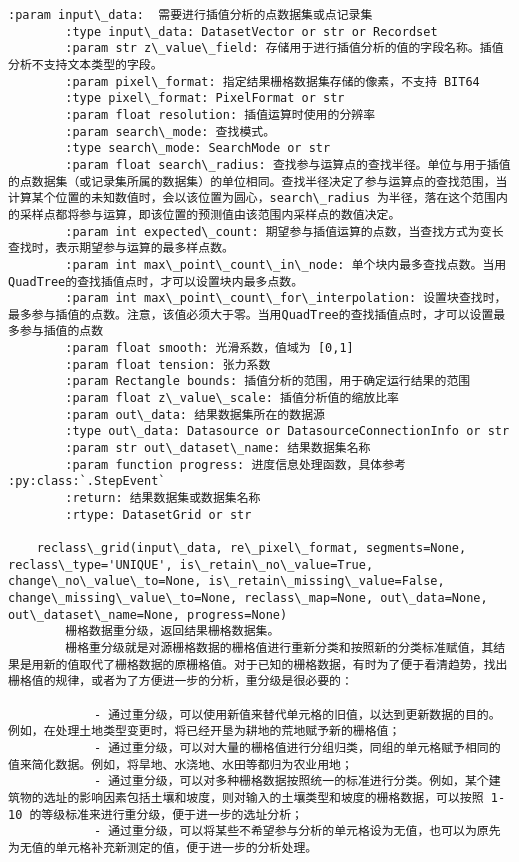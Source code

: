 \documentclass[11pt]{article}
\begin{document}
\begin{Verbatim}[commandchars=\\\{\}]
        :param input\_data:  需要进行插值分析的点数据集或点记录集
        :type input\_data: DatasetVector or str or Recordset
        :param str z\_value\_field: 存储用于进行插值分析的值的字段名称。插值分析不支持文本类型的字段。
        :param pixel\_format: 指定结果栅格数据集存储的像素，不支持 BIT64
        :type pixel\_format: PixelFormat or str
        :param float resolution: 插值运算时使用的分辨率
        :param search\_mode: 查找模式。
        :type search\_mode: SearchMode or str
        :param float search\_radius: 查找参与运算点的查找半径。单位与用于插值的点数据集（或记录集所属的数据集）的单位相同。查找半径决定了参与运算点的查找范围，当计算某个位置的未知数值时，会以该位置为圆心，search\_radius 为半径，落在这个范围内的采样点都将参与运算，即该位置的预测值由该范围内采样点的数值决定。
        :param int expected\_count: 期望参与插值运算的点数，当查找方式为变长查找时，表示期望参与运算的最多样点数。
        :param int max\_point\_count\_in\_node: 单个块内最多查找点数。当用QuadTree的查找插值点时，才可以设置块内最多点数。
        :param int max\_point\_count\_for\_interpolation: 设置块查找时，最多参与插值的点数。注意，该值必须大于零。当用QuadTree的查找插值点时，才可以设置最多参与插值的点数
        :param float smooth: 光滑系数，值域为 [0,1]
        :param float tension: 张力系数
        :param Rectangle bounds: 插值分析的范围，用于确定运行结果的范围
        :param float z\_value\_scale: 插值分析值的缩放比率
        :param out\_data: 结果数据集所在的数据源
        :type out\_data: Datasource or DatasourceConnectionInfo or str
        :param str out\_dataset\_name: 结果数据集名称
        :param function progress: 进度信息处理函数，具体参考 :py:class:`.StepEvent`
        :return: 结果数据集或数据集名称
        :rtype: DatasetGrid or str
    
    reclass\_grid(input\_data, re\_pixel\_format, segments=None, reclass\_type='UNIQUE', is\_retain\_no\_value=True, change\_no\_value\_to=None, is\_retain\_missing\_value=False, change\_missing\_value\_to=None, reclass\_map=None, out\_data=None, out\_dataset\_name=None, progress=None)
        栅格数据重分级，返回结果栅格数据集。
        栅格重分级就是对源栅格数据的栅格值进行重新分类和按照新的分类标准赋值，其结果是用新的值取代了栅格数据的原栅格值。对于已知的栅格数据，有时为了便于看清趋势，找出栅格值的规律，或者为了方便进一步的分析，重分级是很必要的：
        
            - 通过重分级，可以使用新值来替代单元格的旧值，以达到更新数据的目的。例如，在处理土地类型变更时，将已经开垦为耕地的荒地赋予新的栅格值；
            - 通过重分级，可以对大量的栅格值进行分组归类，同组的单元格赋予相同的值来简化数据。例如，将旱地、水浇地、水田等都归为农业用地；
            - 通过重分级，可以对多种栅格数据按照统一的标准进行分类。例如，某个建筑物的选址的影响因素包括土壤和坡度，则对输入的土壤类型和坡度的栅格数据，可以按照 1-10 的等级标准来进行重分级，便于进一步的选址分析；
            - 通过重分级，可以将某些不希望参与分析的单元格设为无值，也可以为原先为无值的单元格补充新测定的值，便于进一步的分析处理。
        

\end{Verbatim}
\end{document}
